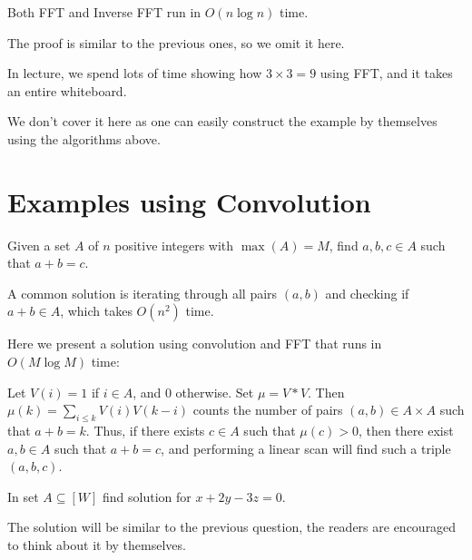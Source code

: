 \begin{theorem}
	Both FFT and Inverse FFT run in \( O(n\log n) \) time.
\end{theorem}
The proof is similar to the previous ones, so we omit it here.

\begin{note}
	In lecture, we spend lots of time showing how $3\times 3 = 9$ using FFT, and it takes an entire whiteboard.

	We don't cover it here as one can easily construct the example by themselves using the algorithms above.
\end{note}

\section{Examples using Convolution}

\begin{question}
	Given a set $A$ of $n$ positive integers with $\max(A) = M$, find $a, b, c\in A$ such that $a + b = c$.
\end{question}

A common solution is iterating through all pairs \( (a,b) \) and checking if \( a+b \in A \), which takes \( O(n^2) \) time.

Here we present a solution using convolution and FFT that runs in \( O(M \log M) \) time:

Let $V(i) = 1$ if $i \in A$, and $0$ otherwise. Set $\mu = V * V$. Then $\mu(k) = \sum_{i\leq k} V(i)V(k-i)$ counts the number of pairs $(a,b) \in A \times A$ such that $a + b = k$. Thus, if there exists $c \in A$ such that $\mu(c) > 0$, then there exist $a,b \in A$ such that $a + b = c$, and performing a linear scan will find such a triple $(a,b,c)$.

\begin{question}
	In set $A\subseteq [W]$ find solution for $x+2y-3z = 0$.
\end{question}

The solution will be similar to the previous question, the readers are encouraged to think about it by themselves.
